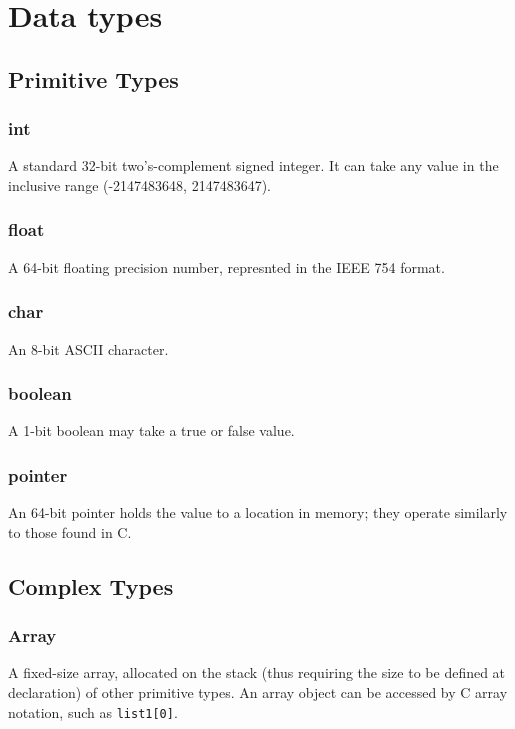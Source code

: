 \chapter{Data types}
    \section{Primitive Types}
        \subsection{int}
            A standard 32-bit two's-complement signed integer. It can take any value in the inclusive range (-2147483648, 2147483647).
        \subsection{float}
            A 64-bit floating precision number, represnted in the IEEE 754 format.            
        \subsection{char}
            An 8-bit ASCII character.  
        \subsection{boolean}
            A 1-bit boolean may take a true or false value. 
        \subsection{pointer}
            An 64-bit pointer holds the value to a location in memory; they operate similarly to those found in C.
    \section{Complex Types}
        \subsection{Array}
            A fixed-size array, allocated on the stack (thus requiring the size to be defined at declaration) of other primitive types. An array object can be accessed by C array notation, such as \texttt{list1[0]}. 
 \iffalse       \subsection{struct}
            A struct is a simple user-defined data structure that holds various primitives, similar to the ones found in C. 
 \fi
